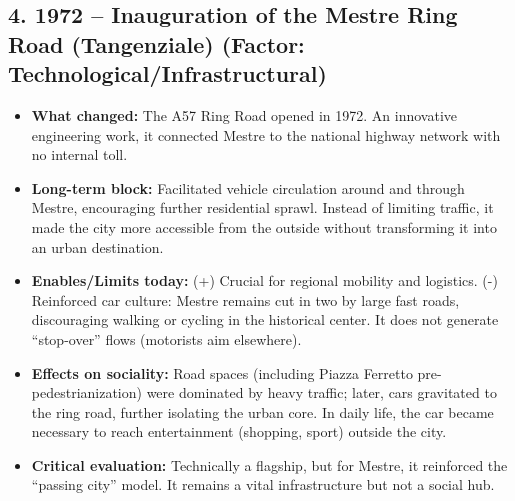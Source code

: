 \documentclass[a4paper,11pt]{article}
\begin{document}
\subsection*{4. 1972 – Inauguration of the Mestre Ring Road (Tangenziale) (Factor: Technological/Infrastructural)}
\begin{itemize}
    \item \textbf{What changed:} The A57 Ring Road opened in 1972. An innovative engineering work, it connected Mestre to the national highway network with no internal toll.
    \item \textbf{Long-term block:} Facilitated vehicle circulation around and through Mestre, encouraging further residential sprawl. Instead of limiting traffic, it made the city more accessible from the outside without transforming it into an urban destination.
    \item \textbf{Enables/Limits today:} (+) Crucial for regional mobility and logistics. (-) Reinforced car culture: Mestre remains cut in two by large fast roads, discouraging walking or cycling in the historical center. It does not generate ``stop-over'' flows (motorists aim elsewhere).
    \item \textbf{Effects on sociality:} Road spaces (including Piazza Ferretto pre-pedestrianization) were dominated by heavy traffic; later, cars gravitated to the ring road, further isolating the urban core. In daily life, the car became necessary to reach entertainment (shopping, sport) outside the city.
    \item \textbf{Critical evaluation:} Technically a flagship, but for Mestre, it reinforced the ``passing city'' model. It remains a vital infrastructure but not a social hub.
\end{itemize}
\end{document}

